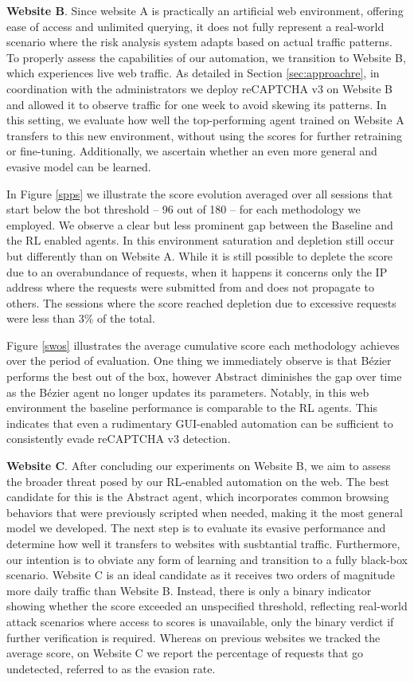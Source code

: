\textbf{Website B}. Since website A is practically an artificial web environment, offering ease of access and unlimited querying, it does not fully represent a real-world scenario where the risk analysis system adapts based on actual traffic patterns.
To properly assess the capabilities of our automation, we transition to Website B, which experiences live web traffic.
As detailed in Section \ref{sec:approachre}, in coordination with the administrators we deploy reCAPTCHA v3 on Website B and allowed it to observe traffic for one week to avoid skewing its patterns.
In this setting, we evaluate how well the top-performing agent trained on Website A transfers to this new environment, without using the scores for further retraining or fine-tuning.
Additionally, we ascertain whether an even more general and evasive model can be learned.

In Figure \ref{spps} we illustrate the score evolution averaged over all sessions that start below the bot threshold -- 96 out of 180 -- for each methodology we employed.
We observe a clear but less prominent gap between the Baseline and the \gls{RL} enabled agents.
In this environment saturation and depletion still occur but differently than on Website A.
While it is still possible to deplete the score due to an overabundance of requests, when it happens it concerns only the IP address where the requests were submitted from and does not propagate to others.
The sessions where the score reached depletion due to excessive requests were less than 3\% of the total.

Figure \ref{swos} illustrates the average cumulative score each methodology achieves over the period of evaluation.
One thing we immediately observe is that Bézier performs the best out of the box, however Abstract diminishes the gap over time as the Bézier agent no longer updates its parameters.
Notably, in this web environment the baseline performance is comparable to the \gls{RL} agents.
This indicates that even a rudimentary GUI-enabled automation can be sufficient to consistently evade reCAPTCHA v3 detection.

\textbf{Website C}. After concluding our experiments on Website B, we aim to assess the broader threat posed by our \gls{RL}-enabled automation on the web.
The best candidate for this is the Abstract agent, which incorporates common browsing behaviors that were previously scripted when needed, making it the most general model we developed.
The next step is to evaluate its evasive performance and determine how well it transfers to websites with susbtantial traffic.
Furthermore, our intention is to obviate any form of learning and transition to a fully black-box scenario.
Website C is an ideal candidate as it receives two orders of magnitude more daily traffic than Website B.
Instead, there is only a binary indicator showing whether the score exceeded an unspecified threshold, reflecting real-world attack scenarios where access to scores is unavailable, only the binary verdict if further verification is required.
Whereas on previous websites we tracked the average score, on Website C we report the percentage of requests that go undetected, referred to as the evasion rate.

